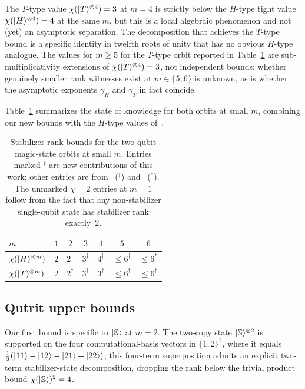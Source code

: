 \documentclass[11pt]{article}
\theoremstyle{definition}
\newcommand{\microspace}{\mspace{0.5mu}}
\newcommand{\ket}[1]{\lvert\microspace #1 \microspace \rangle}
\newcommand{\chiR}{\chi}
\newcommand{\Strange}{\ket{\mathbb{S}}}
\begin{document}
	The $T$-type value $\chiR(\ket{T}^{\otimes 4}) = 3$ at $m = 4$
	is strictly below the $H$-type tight value
	$\chiR(\ket{H}^{\otimes 4}) = 4$ at the same $m$, but this is a
	local algebraic phenomenon and not (yet) an asymptotic separation.
	The decomposition that achieves the $T$-type bound is a specific
	identity in twelfth roots of unity that has no obvious
	$H$-type analogue. The values for $m \ge 5$ for the $T$-type
	orbit reported in Table~\ref{tab:qubit-ub} are sub-multiplicativity
	extensions of $\chiR(\ket{T}^{\otimes 4}) = 3$, not independent
	bounds; whether genuinely smaller rank witnesses exist at
	$m \in \{5, 6\}$ is unknown, as is whether the
	asymptotic exponents $\gamma_H$ and $\gamma_T$ in fact coincide.

	Table~\ref{tab:qubit-ub} summarizes the state of knowledge for both
	orbits at small $m$, combining our new bounds with the $H$-type values
	of~\cite{qassim2021improved}.

	\begin{table}[!htbp]
		\centering
		\begin{tabular}{l c c c c c c}
			\toprule
			$m$ & $1$ & $2$ & $3$ & $4$ & $5$ & $6$ \\
			\midrule
			$\chiR(\ket{H}^{\otimes m})$ & $2$ & $2^{\dagger}$ & $3^{\dagger}$ & $4^{\dagger}$ & $\le 6^{\dagger}$ & $\le 6^{\ast}$ \\
			$\chiR(\ket{T}^{\otimes m})$ & $2$ & $2^{\ddagger}$ & $3^{\ddagger}$ & $3^{\ddagger}$ & $\le 6^{\ddagger}$ & $\le 6^{\ddagger}$ \\
			\bottomrule
		\end{tabular}
		\caption{Stabilizer rank bounds for the two qubit magic-state orbits at small $m$. Entries marked $^{\ddagger}$ are new contributions of this work; other entries are from~\cite{bravyi2016trading} ($^{\dagger}$) and~\cite{qassim2021improved} ($^{\ast}$). The unmarked $\chiR = 2$ entries at $m = 1$ follow from the fact that any non-stabilizer single-qubit state has stabilizer rank exactly~$2$.}
		\label{tab:qubit-ub}
	\end{table}

	\subsection{Qutrit upper bounds}\label{ssec:upper}
	
	Our first bound is specific to $\Strange$ at $m = 2$. The two-copy
	state $\Strange^{\otimes 2}$ is supported on the four
	computational-basis vectors in $\{1, 2\}^2$, where it
	equals $\frac{1}{2}(\ket{11} - \ket{12} - \ket{21} + \ket{22})$;
	this four-term superposition admits an explicit two-term
	stabilizer-state decomposition, dropping the rank below the trivial
	product bound $\chiR(\Strange)^2 = 4$.
	
\end{document}
